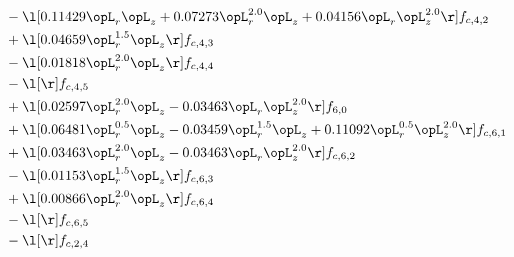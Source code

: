 \begin{alignat}{2}
& - \l[  0.11429 \opL_r \opL_z +  0.07273 \opL_r^{2.0} \opL_z +  0.04156 \opL_r \opL_z^{2.0}  \r] f_{c,4,2} \nonumber \\ 
& + \l[  0.04659 \opL_r^{1.5} \opL_z  \r] f_{c,4,3} \nonumber \\ 
& - \l[  0.01818 \opL_r^{2.0} \opL_z  \r] f_{c,4,4} \nonumber \\ 
& - \l[  \r] f_{c,4,5} \nonumber \\ 
& + \l[  0.02597 \opL_r^{2.0} \opL_z   -0.03463 \opL_r \opL_z^{2.0}  \r] f_{6,0} \nonumber \\ 
& + \l[  0.06481 \opL_r^{0.5} \opL_z   -0.03459 \opL_r^{1.5} \opL_z +  0.11092 \opL_r^{0.5} \opL_z^{2.0}  \r] f_{c,6,1} \nonumber \\ 
& + \l[  0.03463 \opL_r^{2.0} \opL_z   -0.03463 \opL_r \opL_z^{2.0}  \r] f_{c,6,2} \nonumber \\ 
& - \l[  0.01153 \opL_r^{1.5} \opL_z  \r] f_{c,6,3} \nonumber \\ 
& + \l[  0.00866 \opL_r^{2.0} \opL_z  \r] f_{c,6,4} \nonumber \\ 
& - \l[  \r] f_{c,6,5} \nonumber \\ 
& - \l[  \r] f_{c,2,4} \nonumber \\ 
\end{alignat} 


